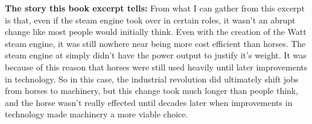 

\textbf{The story this book excerpt tells:} From what I can gather from this excerpt is that, even if the steam engine took over in certain roles, it wasn't an abrupt change like most people would initially think.  Even with the creation of the Watt steam engine, it was still nowhere near being more cost efficient than horses.  The steam engine at simply didn't have the power output to justify it's weight.  It was because of this reason that horses were still used heavily until later improvements in technology.  So in this case, the industrial revolution did ultimately shift jobs from horses to machinery, but this change took much longer than people think, and the horse wasn't really effected until decades later when improvements in technology made machinery a more viable choice.